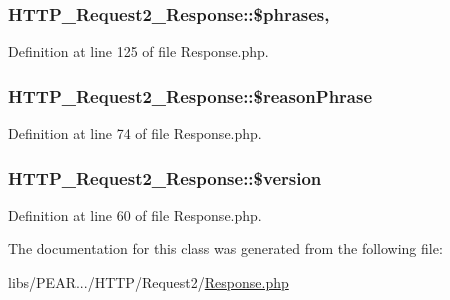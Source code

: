 \hypertarget{classHTTP__Request2__Response_ad9a8fd735e8dc89eb7afc73750ec0bbc}{
\subsubsection[{\$phrases}]{\setlength{\rightskip}{0pt plus 5cm}H\-T\-T\-P\-\_\-\-Request2\-\_\-\-Response\-::\$phrases\hspace{0.3cm}{\ttfamily [static]}, {\ttfamily [protected]}}}\label{classHTTP__Request2__Response_ad9a8fd735e8dc89eb7afc73750ec0bbc}


Definition at line 125 of file Response.\-php.

\hypertarget{classHTTP__Request2__Response_ab9faa50ba9b9f208a02a7c4ce75b391a}{
\subsubsection[{\$reason\-Phrase}]{\setlength{\rightskip}{0pt plus 5cm}H\-T\-T\-P\-\_\-\-Request2\-\_\-\-Response\-::\$reason\-Phrase\hspace{0.3cm}{\ttfamily [protected]}}}\label{classHTTP__Request2__Response_ab9faa50ba9b9f208a02a7c4ce75b391a}


Definition at line 74 of file Response.\-php.

\hypertarget{classHTTP__Request2__Response_aadbcb4df3711846a3b890c5492c4ffe7}{
\subsubsection[{\$version}]{\setlength{\rightskip}{0pt plus 5cm}H\-T\-T\-P\-\_\-\-Request2\-\_\-\-Response\-::\$version\hspace{0.3cm}{\ttfamily [protected]}}}\label{classHTTP__Request2__Response_aadbcb4df3711846a3b890c5492c4ffe7}


Definition at line 60 of file Response.\-php.



The documentation for this class was generated from the following file\-:\begin{DoxyCompactItemize}
\item 
libs/\-P\-E\-A\-R.../\-H\-T\-T\-P/\-Request2/\hyperlink{Response_8php}{Response.\-php}\end{DoxyCompactItemize}

